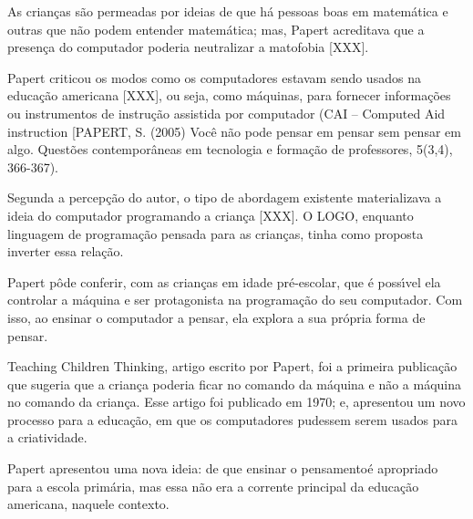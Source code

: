 \documentclass[
12pt,		%
openright,	%
twoside,  %
a4paper,			%
chapter=TITLE,		%
english,			%
french,				%
spanish,			%
brazil				%
]{USPSC-classe/USPSC}
\begin{document}
As crian\c{c}as s\~ao permeadas por ideias de que h\'a pessoas boas em matem\'atica e outras que n\~ao podem entender matem\'atica; mas, Papert acreditava que a presen\c{c}a do computador poderia neutralizar a matofobia [XXX].










Papert criticou os modos como os computadores estavam sendo usados na educa\c{c}\~ao americana [XXX], ou seja, como m\'aquinas, para fornecer informa\c{c}\~oes ou instrumentos de instru\c{c}\~ao assistida por computador (CAI – Computed Aid instruction [PAPERT, S. (2005) Voc\^e n\~ao pode pensar em pensar sem pensar em algo. Quest\~oes contempor\^aneas em tecnologia e forma\c{c}\~ao de professores, 5(3,4), 366-367).










Segunda a percep\c{c}\~ao do autor, o tipo de abordagem existente materializava a ideia do computador programando a crian\c{c}a [XXX]. O LOGO, enquanto linguagem de programa\c{c}\~ao pensada para as crian\c{c}as, tinha como proposta inverter essa rela\c{c}\~ao.










Papert p\^ode conferir, com as crian\c{c}as em idade pr\'e-escolar, que \'e poss\'{\i}vel ela controlar a m\'aquina e ser protagonista na programa\c{c}\~ao do seu computador. Com isso, ao ensinar o computador a pensar, ela explora a sua pr\'opria forma de pensar.










Teaching Children Thinking, artigo escrito por Papert, foi a primeira publica\c{c}\~ao que sugeria que a crian\c{c}a poderia ficar no comando da m\'aquina e n\~ao a m\'aquina no comando da crian\c{c}a.  Esse artigo  foi publicado em 1970; e,  apresentou um novo processo para a educa\c{c}\~ao, em que os computadores pudessem serem usados para a criatividade.










Papert apresentou uma nova ideia: de que \textquotedbl ensinar o pensamento\textquotedbl   \'e apropriado para a escola prim\'aria, mas essa n\~ao era a corrente principal da educa\c{c}\~ao americana, naquele contexto.
\end{document}
